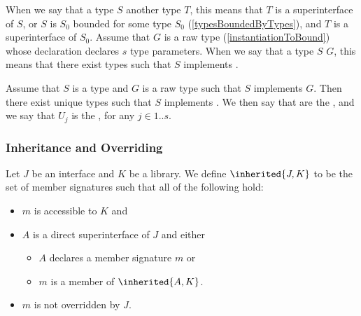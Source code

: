 \documentclass[makeidx]{article}
\begin{document}
\LMHash{}%
When we say that a type $S$
another type $T$,
this means that $T$ is a superinterface of $S$,
or $S$ is $S_0$ bounded for some type $S_0$
(\ref{typesBoundedByTypes}),
and $T$ is a superinterface of $S_0$.
Assume that $G$ is a raw type
(\ref{instantiationToBound})
whose declaration declares $s$ type parameters.
When we say that a type $S$
$G$,
this means that there exist types 
such that $S$ implements .


\LMHash{}%
Assume that $S$ is a type and $G$ is a raw type such that $S$ implements $G$.
Then there exist unique types  such that
$S$ implements .
We then say that  are the
,
and we say that $U_j$ is the
,
for any $j \in 1 .. s$.



\subsubsection{Inheritance and Overriding}

\LMHash{}%
%
Let $J$ be an interface and $K$ be a library.
We define $\inherited{J, K}$ to be the set of member signatures
such that all of the following hold:
\begin{itemize}
\item $m$ is accessible to $K$ and
\item $A$ is a direct superinterface of $J$ and either
  \begin{itemize}
  \item $A$ declares a member signature $m$ or
  \item $m$ is a member of $\inherited{A, K}$.
  \end{itemize}
\item $m$ is not overridden by $J$.
\end{itemize}
\end{document}
